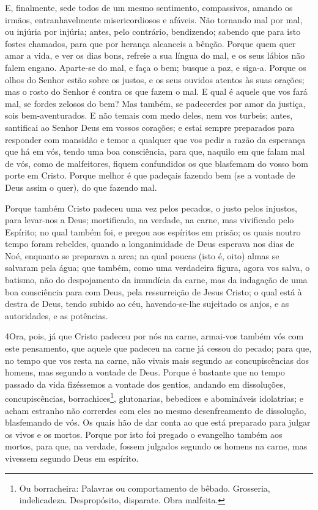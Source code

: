 E, finalmente, sede todos de um mesmo sentimento, compassivos,
amando os irmãos, entranhavelmente misericordiosos e afáveis.
Não tornando mal por mal, ou injúria por injúria; antes, pelo
contrário, bendizendo; sabendo que para isto fostes chamados, para
que por herança alcanceis a bênção. Porque quem quer amar a
vida, e ver os dias bons, refreie a sua língua do mal, e os seus
lábios não falem engano. Aparte-se do mal, e faça o bem;
busque a paz, e siga-a. Porque os olhos do Senhor estão sobre
os justos, e os seus ouvidos atentos às suas orações; mas o rosto do
Senhor é contra os que fazem o mal. E qual é aquele que vos
fará mal, se fordes zelosos do bem? Mas também, se padecerdes
por amor da justiça, sois bem-aventurados. E não temais com medo
deles, nem vos turbeis; antes, santificai ao Senhor Deus em
vossos corações; e estai sempre preparados para responder com
mansidão e temor a qualquer que vos pedir a razão da esperança que
há em vós, tendo uma boa consciência, para que, naquilo em
que falam mal de vós, como de malfeitores, fiquem confundidos os que
blasfemam do vosso bom porte em Cristo. Porque melhor é que
padeçais fazendo bem (se a vontade de Deus assim o quer), do que
fazendo mal.

Porque também Cristo padeceu uma vez pelos pecados, o justo pelos
injustos, para levar-nos a Deus; mortificado, na verdade, na carne,
mas vivificado pelo Espírito; no qual também foi, e pregou
aos espíritos em prisão; os quais noutro tempo foram
rebeldes, quando a longanimidade de Deus esperava nos dias de Noé,
enquanto se preparava a arca; na qual poucas (isto é, oito) almas se
salvaram pela água; que também, como uma verdadeira figura,
agora vos salva, o batismo, não do despojamento da imundícia da
carne, mas da indagação de uma boa consciência para com Deus, pela
ressurreição de Jesus Cristo; o qual está à destra de Deus,
tendo subido ao céu, havendo-se-lhe sujeitado os anjos, e as
autoridades, e as potências.

\medskip

\lettrine{4} Ora, pois, já que Cristo padeceu por nós na
carne, armai-vos também vós com este pensamento, que aquele que
padeceu na carne já cessou do pecado; para que, no tempo que vos
resta na carne, não vivais mais segundo as concupiscências dos
homens, mas segundo a vontade de Deus. Porque é bastante que no
tempo passado da vida fizéssemos a vontade dos gentios, andando em
dissoluções, concupiscências, borrachices\footnote{Ou borracheira:
Palavras ou comportamento de bêbado. Grosseria, indelicadeza.
Despropósito, disparate. Obra malfeita.}, glutonarias, bebedices e
abomináveis idolatrias; e acham estranho não correrdes com eles
no mesmo desenfreamento de dissolução, blasfemando de vós. Os
quais hão de dar conta ao que está preparado para julgar os vivos e
os mortos. Porque por isto foi pregado o evangelho também aos
mortos, para que, na verdade, fossem julgados segundo os homens na
carne, mas vivessem segundo Deus em espírito.

